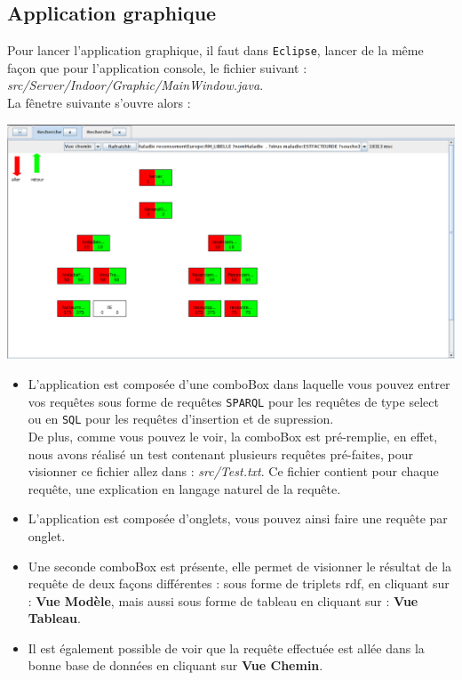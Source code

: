 \documentclass[12pt]{article}
\begin{document}
	\subsection{Application graphique}
	Pour lancer l'application graphique, il faut dans \texttt{Eclipse}, lancer de la même façon que pour l'application console, le fichier suivant : \textit{src/Server/Indoor/Graphic/MainWindow.java}. \\
	\indent La fênetre suivante s'ouvre alors : 
	\begin{center}
	\includegraphics[width=1\textwidth]{Image/appli.png}
	\begin{itemize}
	\item L'application est composée d'une comboBox dans laquelle vous pouvez entrer vos requêtes sous forme de requêtes \texttt{SPARQL} pour les requêtes de type select ou en \texttt{SQL} pour les requêtes d'insertion et de supression. \\
	\indent De plus, comme vous pouvez le voir, la comboBox est pré-remplie, en effet, nous avons réalisé un test contenant plusieurs requêtes pré-faites, pour visionner ce fichier allez dans : \textit{src/Test.txt}. Ce fichier contient pour chaque requête, une explication en langage naturel de la requête.
	\item L'application est composée d'onglets, vous pouvez ainsi faire une requête par onglet.
	\item Une seconde comboBox est présente, elle permet de visionner le résultat de la requête de deux façons différentes : sous forme de triplets rdf, en cliquant sur : \textbf{Vue Modèle}, mais aussi sous forme de tableau en cliquant sur : \textbf{Vue Tableau}.
	\item Il est également possible de voir que la requête effectuée est allée dans la bonne base de données en cliquant sur \textbf{Vue Chemin}.
	\end{itemize}
\end{center}
\end{document}
